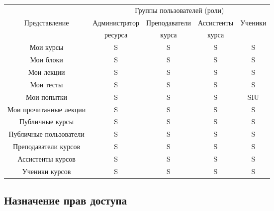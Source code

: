 \documentclass[a4paper,14pt]{article}
\begin{document}
\begin{table}[H]
	\begin{flushleft} 
	\end{flushleft}
	\begin{adjustbox}{width=\linewidth}
	\begin{tabular}{|c|c|c|c|c|}
		\hline
		& \multicolumn{4}{c|}{Группы пользователей (роли)}     \\ \cline{2-5} 
		Представление          & Администратор & Преподаватели & Ассистенты & Ученики \\
		& ресурса       & курса         & курса      &         \\ \hline
		Мои курсы              & S             & S             & S          & S       \\ \hline
		Мои блоки              & S             & S             & S          & S       \\ \hline
		Мои лекции             & S             & S             & S          & S       \\ \hline
		Мои тесты              & S             & S             & S          & S       \\ \hline
		Мои попытки            & S             & S             & S          & SIU     \\ \hline
		Мои прочитанные лекции & S             & S             & S          & S       \\ \hline
		Публичные курсы        & S             & S             & S          & S       \\ \hline
		Публичные пользователи & S             & S             & S          & S       \\ \hline
		Преподаватели курсов   & S             & S             & S          & S       \\ \hline
		Ассистенты курсов      & S             & S             & S          & S       \\ \hline
		Ученики курсов         & S             & S             & S          & S       \\ \hline
	\end{tabular}
	\end{adjustbox}
\end{table}

\subsection{Назначение прав доступа}
\end{document}
